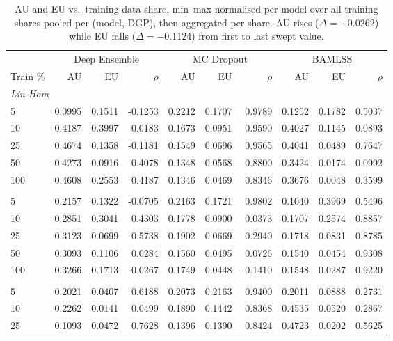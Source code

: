 \begin{table}
\centering
\small
\setlength{\tabcolsep}{4pt}
\caption{AU and EU vs.\ training-data share, min--max normalised per model over all training shares pooled per (model, DGP), then aggregated per share. AU rises (\ensuremath{\Delta=+0.0262}) while EU falls (\ensuremath{\Delta=-0.1124}) from first to last swept value.}
\label{tab:samplesize}
\begin{tabular}{lrrrrrrrrr}
\toprule
 & \multicolumn{3}{c}{Deep Ensemble} & \multicolumn{3}{c}{MC Dropout} & \multicolumn{3}{c}{BAMLSS} \\
\cmidrule(lr){2-4} \cmidrule(lr){5-7} \cmidrule(lr){8-10}
Train \% & AU & EU & $\rho$ & AU & EU & $\rho$ & AU & EU & $\rho$ \\
\midrule
\multicolumn{10}{l}{\textit{Lin-Hom}} \\
5 & 0.0995 & 0.1511 & -0.1253 & 0.2212 & 0.1707 & 0.9789 & 0.1252 & 0.1782 & 0.5037 \\
10 & 0.4187 & 0.3997 & 0.0183 & 0.1673 & 0.0951 & 0.9590 & 0.4027 & 0.1145 & 0.0893 \\
25 & 0.4674 & 0.1358 & -0.1181 & 0.1549 & 0.0696 & 0.9565 & 0.4041 & 0.0489 & 0.7647 \\
50 & 0.4273 & 0.0916 & 0.4078 & 0.1348 & 0.0568 & 0.8800 & 0.3424 & 0.0174 & 0.0992 \\
100 & 0.4608 & 0.2553 & 0.4187 & 0.1346 & 0.0469 & 0.8346 & 0.3676 & 0.0048 & 0.3599 \\
\addlinespace
\multicolumn{10}{l}{\textit{Lin-Het}} \\
5 & 0.2157 & 0.1322 & -0.0705 & 0.2163 & 0.1721 & 0.9802 & 0.1040 & 0.3969 & 0.5496 \\
10 & 0.2851 & 0.3041 & 0.4303 & 0.1778 & 0.0900 & 0.0373 & 0.1707 & 0.2574 & 0.8857 \\
25 & 0.3123 & 0.0699 & 0.5738 & 0.1902 & 0.0669 & 0.2940 & 0.1718 & 0.0831 & 0.8785 \\
50 & 0.3093 & 0.1106 & 0.0284 & 0.1560 & 0.0495 & 0.0726 & 0.1540 & 0.0454 & 0.9308 \\
100 & 0.3266 & 0.1713 & -0.0267 & 0.1749 & 0.0448 & -0.1410 & 0.1548 & 0.0287 & 0.9220 \\
\addlinespace
\multicolumn{10}{l}{\textit{Sin-Hom}} \\
5 & 0.2021 & 0.0407 & 0.6188 & 0.2073 & 0.2163 & 0.9400 & 0.2011 & 0.0888 & 0.2731 \\
10 & 0.2262 & 0.0141 & 0.0499 & 0.1890 & 0.1442 & 0.8368 & 0.4535 & 0.0520 & 0.2867 \\
25 & 0.1093 & 0.0472 & 0.7628 & 0.1396 & 0.1390 & 0.8424 & 0.4723 & 0.0202 & 0.5625 \\

\end{tabular}
\end{table}
